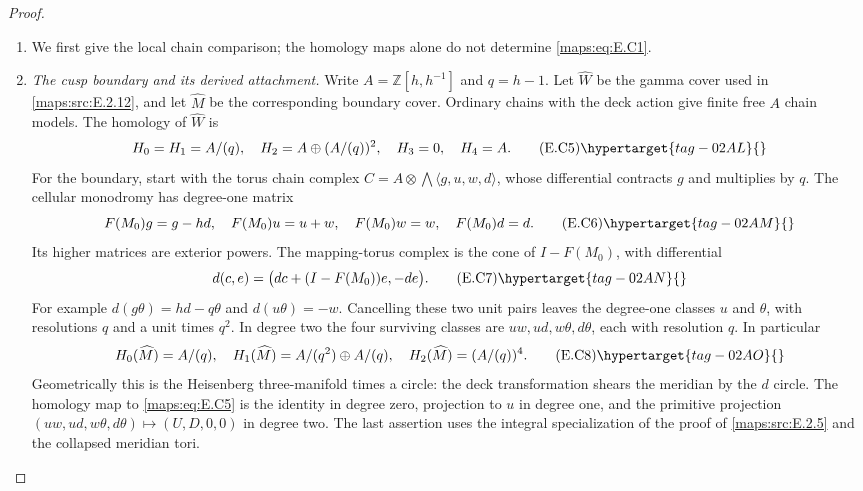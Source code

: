 \begin{proof}
\begin{enumerate}[label={$\langle1\rangle$\arabic*.},leftmargin=*]
\item We first give the local chain comparison; the homology maps alone do not determine \eqref{maps:eq:E.C1}.

\item \emph{The cusp boundary and its derived attachment.}
Write $A=\mathbb Z[h,h^{-1}]$ and $q=h-1$. Let
$\widehat W$ be the gamma cover used in \ref{maps:src:E.2.12}, and let
$\widehat M$ be the corresponding boundary cover. Ordinary
chains with the deck action give finite free $A$ chain
models. The homology of $\widehat W$ is
\[
 H_0=H_1=A/(q),\quad H_2=A\oplus(A/(q))^2,
 \quad H_3=0,\quad H_4=A.
 \tag{E.C5}\hypertarget{tag-02AL}{}\label{maps:eq:E.C5}
\]
For the boundary, start with the torus chain complex
$C= A\otimes\bigwedge\langle g,u,w,d\rangle$,
whose differential contracts $g$ and multiplies by $q$.
The cellular monodromy has degree-one matrix
\[
 F(M_0)g=g-hd,\quad F(M_0)u=u+w,
 \quad F(M_0)w=w,\quad F(M_0)d=d.
 \tag{E.C6}\hypertarget{tag-02AM}{}\label{maps:eq:E.C6}
\]
Its higher matrices are exterior powers. The mapping-torus
complex is the cone of $I-F(M_0)$, with differential
\[
 d(c,e)=\big(dc+(I-F(M_0))e,-de\big).
 \tag{E.C7}\hypertarget{tag-02AN}{}\label{maps:eq:E.C7}
\]
For example $d(g\theta)=hd-q\theta$ and
$d(u\theta)=-w$. Cancelling these two unit pairs leaves
the degree-one classes $u$ and $\theta$, with resolutions
$q$ and a unit times $q^2$. In degree two the four surviving
classes are $uw,ud,w\theta,d\theta$, each with resolution
$q$. In particular
\[
 H_0(\widehat M)=A/(q),\quad
 H_1(\widehat M)=A/(q^2)\oplus A/(q),\quad
 H_2(\widehat M)=(A/(q))^4.
 \tag{E.C8}\hypertarget{tag-02AO}{}\label{maps:eq:E.C8}
\]
Geometrically this is the Heisenberg three-manifold times
a circle: the deck transformation shears the meridian
by the $d$ circle. The homology map to \eqref{maps:eq:E.C5} is the
identity in degree zero, projection to $u$ in degree one,
and the primitive projection
$(uw,ud,w\theta,d\theta)\mapsto(U,D,0,0)$ in degree two.
The last assertion uses the integral specialization of the proof of \cref{maps:src:E.2.5} and the collapsed meridian tori.


\end{enumerate}
\end{proof}
